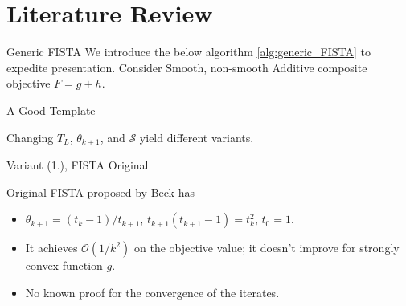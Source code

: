 \documentclass[11pt]{beamer}
\theoremstyle{definition}
\begin{document}
\section{Literature Review}
    \begin{frame}{Generic FISTA}
        We introduce the below algorithm \ref*{alg:generic_FISTA} to expedite presentation. Consider Smooth, non-smooth Additive composite objective $F = g + h$. 
        \begin{block}{A Good Template}
            \begin{algorithm}[H]
                \begin{algorithmic}[1]
                    \ENDFOR
                \end{algorithmic}
                \caption{Generic FISTA}
                \label{alg:generic_FISTA}
            \end{algorithm}
        \end{block}
        Changing $T_L$, $\theta_{k + 1}$, and $\mathcal S$ yield different variants. 
    \end{frame}
    \begin{frame}{Variant (1.), FISTA Original}
        \begin{algorithm}[H]
            \begin{tiny}
                \begin{algorithmic}[1]
                    \ENDFOR
                \end{algorithmic}
                \caption{Generic FISTA}    
            \end{tiny}
        \end{algorithm}
        Original FISTA proposed by Beck \cite{beck_fast_2009-1} has 
        \begin{itemize}
            \item $\theta_{k + 1} = (t_k - 1)/t_{k + 1}$, $t_{k + 1}(t_{k + 1} - 1) = t_{k}^2$, $t_0 = 1$. 
            \item It achieves $\mathcal O(1/k^2)$ on the objective value; it doesn't improve for strongly convex function $g$. 
            \item No known proof for the convergence of the iterates. 
        \end{itemize}
    \end{frame}
\end{document}
